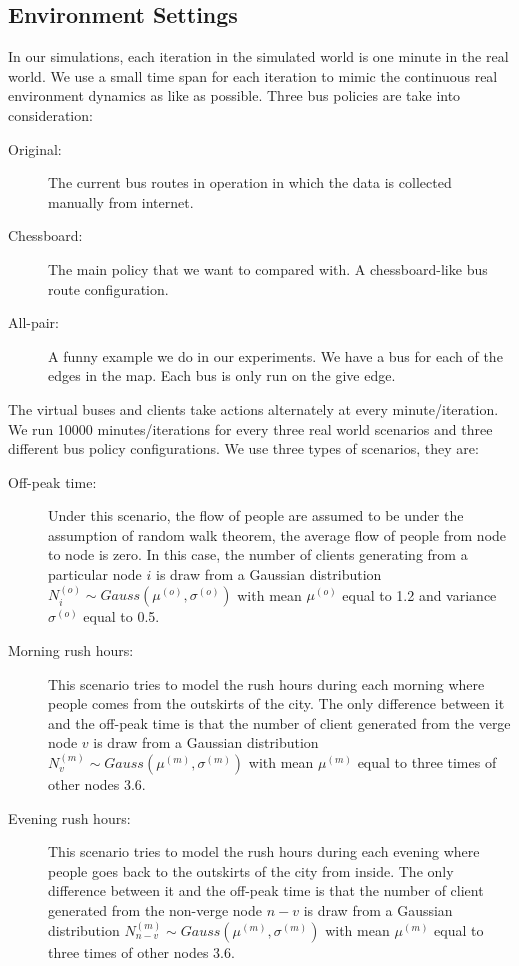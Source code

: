 \documentclass{sig-alternate}
\begin{document}
\subsection{Environment Settings}
In our simulations, each iteration in the simulated world is one minute in the real world. We use a small time span for each iteration to mimic the continuous real environment dynamics as like as possible.
Three bus policies are take into consideration:
\begin{description}
\item[Original:] The current bus routes in operation in which the data is collected manually from internet.
\item[Chessboard:] The main policy that we want to compared with. A chessboard-like bus route configuration.
\item[All-pair:] A funny example we do in our experiments. We have a bus for each of the edges in the map. Each bus is only run on the give edge.
\end{description}
The virtual buses and clients take actions alternately at every minute/iteration.
We run 10000 minutes/iterations for every three real world scenarios and three different bus policy configurations.
We use three types of scenarios, they are: 
\begin{description}
\item [Off-peak time:] Under this scenario, the flow of people are assumed to be under the assumption of random walk theorem, the average flow of people from node to node is zero. In this case, the number of clients generating from a particular node $i$ is draw from a Gaussian distribution $N_{i}^{(o)} \sim Gauss(\mu^{(o)},\sigma^{(o)})$ with mean $\mu^{(o)}$ equal to 1.2 and variance $\sigma^{(o)}$ equal to 0.5.
\item [Morning rush hours:] This scenario tries to model the rush hours during each morning where people comes from the outskirts of the city. The only difference between it and the off-peak time is that the number of client generated from the verge node $v$ is draw from a Gaussian distribution $N_{v}^{(m)} \sim Gauss(\mu^{(m)},\sigma^{(m)})$ with mean $\mu^{(m)}$ equal to three times of other nodes 3.6.
\item [Evening rush hours:] This scenario tries to model the rush hours during each evening where people goes back to the outskirts of the city from inside. The only difference between it and the off-peak time is that the number of client generated from the non-verge node $n-v$ is draw from a Gaussian distribution $N_{n-v}^{(m)} \sim Gauss(\mu^{(m)},\sigma^{(m)})$ with mean $\mu^{(m)}$ equal to three times of other nodes 3.6.
\end{description} 
\end{document}
